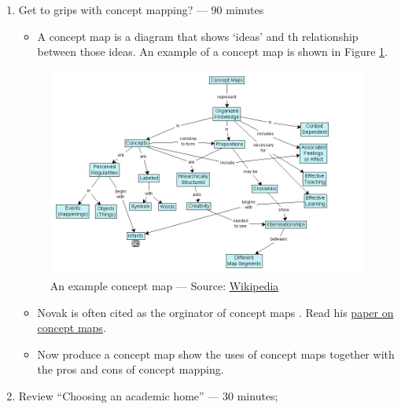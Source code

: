 \documentclass[]{book}
\providecommand{\tightlist}{%
  \setlength{\itemsep}{0pt}\setlength{\parskip}{0pt}}
\theoremstyle{definition}
\theoremstyle{definition}
\theoremstyle{definition}
\theoremstyle{remark}
\begin{document}
\begin{enumerate}
\def\labelenumi{\arabic{enumi}.}
\item
  Get to grips with concept mapping? --- 90 minutes

  \begin{itemize}
  \tightlist
  \item
    A concept map is a diagram that shows `ideas' and th relationship
    between those ideas. An example of a concept map is shown in Figure
    \ref{fig:exampleCM}.
  \end{itemize}

  \begin{figure}
   \includegraphics[width=12.33in]{images/ConceptMap} \caption{An example concept map --- Source:
\href{https://upload.wikimedia.org/wikipedia/commons/d/df/Conceptmap.png}{Wikipedia}}\label{fig:exampleCM}
   \end{figure}

  \begin{itemize}
  \item
    Novak is often cited as the orginator of concept maps \autocite[for
    example,][]{novak_2006_originsconceptmapping}. Read his
    \href{https://msu.edu/~luckie/ctools/}{paper on concept maps}.
  \item
    Now produce a concept map show the uses of concept maps together
    with the pros and cons of concept mapping.
  \end{itemize}
\item
  Review ``Choosing an academic home''
  \autocite{huff_2009_designingresearchpublication} --- 30 minutes;
\end{enumerate}
\end{document}
